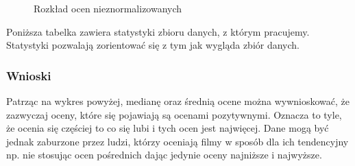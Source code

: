 \documentclass[12pt, a4paper]{article}
\begin{document}
\begin{figure}[H]
  \begin{center}
  \end{center}
  \caption{Rozkład ocen nieznormalizowanych}
  \label{fig:histogram-ocen-nieznorm}
\end{figure}

Poniższa tabelka zawiera statystyki zbioru danych, z którym pracujemy. Statystyki pozwalają zorientować się z tym jak wygląda zbiór danych.


\subsubsection{Wnioski}
Patrząc na wykres powyżej, medianę oraz średnią ocene można wywnioskować, że zazwyczaj oceny, które się pojawiają są ocenami pozytywnymi. Oznacza to tyle, że ocenia się częściej to co się lubi i tych ocen jest najwięcej. Dane mogą być jednak zaburzone przez ludzi, którzy oceniają filmy w sposób dla ich tendencyjny np. nie stosując ocen pośrednich dając jedynie oceny najniższe i najwyższe.
\end{document}
